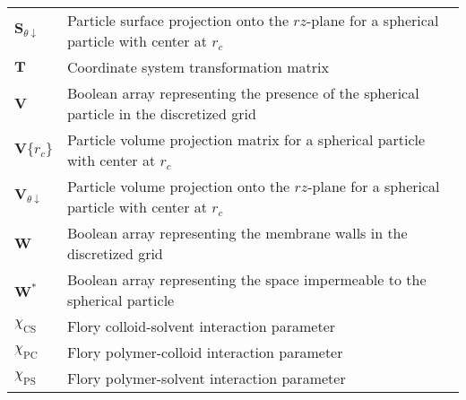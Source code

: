 \documentclass[10pt, a4paper]{article}
\begin{document}
\begin{tabularx}{\linewidth}{l X}
    $\bm{S}_{\theta\downarrow}$ & Particle surface projection onto the $rz$-plane for a spherical particle with center at $r_{c}$ \\
    $\bm{T}$ & Coordinate system transformation matrix \\
    $\bm{V}$ & Boolean array representing the presence of the spherical particle in the discretized grid \\
    $\bm{V}\{r_{c}\}$ & Particle volume projection matrix for a spherical particle with center at $r_{c}$ \\
    $\bm{V}_{\theta\downarrow}$ & Particle volume projection onto the $rz$-plane for a spherical particle with center at $r_{c}$ \\
    $\bm{W}$ & Boolean array representing the membrane walls in the discretized grid \\
    $\bm{W}^{\ast}$ & Boolean array representing the space impermeable to the spherical particle \\
    $\chi_{\text{CS}}$ & Flory colloid-solvent interaction parameter \\
    $\chi_{\text{PC}}$ & Flory polymer-colloid interaction parameter \\
    $\chi_{\textrm{PS}}$ & Flory polymer-solvent interaction parameter \\
\end{tabularx}

\printbibliography
\end{document}
